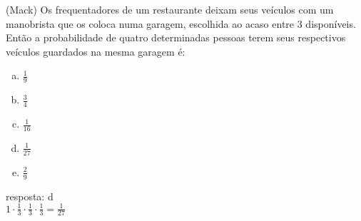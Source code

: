 \begin{ex}
	(Mack) Os frequentadores de um restaurante deixam seus veículos com um manobrista que os coloca numa garagem,  escolhida ao acaso entre  3 disponíveis.  Então a probabilidade de quatro determinadas pessoas terem seus respectivos veículos guardados na mesma garagem é:  
    \begin{enumerate}[(a)]
    \item $\frac{1}{9}$
    \item $\frac{3}{4}$
    \item $\frac{1}{16}$
    \item $\frac{1}{27}$
    \item $\frac{2}{9}$
    \end{enumerate}
      \begin{sol}
      resposta: d \\
      $1\cdot\frac{1}{3}\cdot\frac{1}{3}\cdot\frac{1}{3}=\frac{1}{27}$
      \end{sol}
\end{ex}